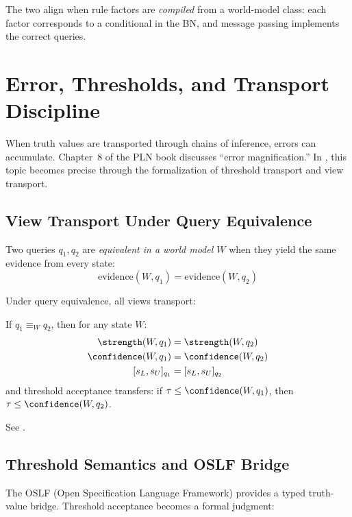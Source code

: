 \documentclass[11pt,openany]{report}
\begin{document}
The two align when rule factors are \emph{compiled} from a world-model
class: each factor corresponds to a conditional in the BN, and message
passing implements the correct queries.


\chapter{Error, Thresholds, and Transport Discipline}
\label{ch:error-transport}

When truth values are transported through chains of inference, errors can
accumulate.  Chapter~8 of the PLN book discusses ``error magnification.''
In \xiPLN{}, this topic becomes precise through the formalization of
threshold transport and view transport.

\section{View Transport Under Query Equivalence}

\begin{definition}
Two queries $q_1, q_2$ are \emph{equivalent in a world model $W$} when
they yield the same evidence from every state:
\[
  \mathrm{evidence}(W, q_1) = \mathrm{evidence}(W, q_2)
\]
\end{definition}

Under query equivalence, all views transport:

\begin{theorem}
If $q_1 \equiv_W q_2$, then for any state $W$:
\begin{align}
  \strength(W, q_1) &= \strength(W, q_2) \\
  \confidence(W, q_1) &= \confidence(W, q_2) \\
  [s_L, s_U]_{q_1} &= [s_L, s_U]_{q_2}
\end{align}
and threshold acceptance transfers: if $\tau \le \confidence(W, q_1)$,
then $\tau \le \confidence(W, q_2)$.
\end{theorem}

See .

\section{Threshold Semantics and OSLF Bridge}

The OSLF (Open Specification Language Framework) provides a typed
truth-value bridge.  Threshold acceptance becomes a formal judgment:
\end{document}
